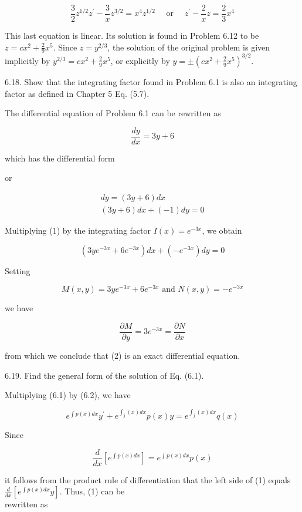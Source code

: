 \documentclass[10pt]{article}
\begin{document}
$$
\frac{3}{2} z^{1 / 2} z^{\prime}-\frac{3}{x} z^{3 / 2}=x^{4} z^{1 / 2} \quad \text { or } \quad z^{\prime}-\frac{2}{x} z=\frac{2}{3} x^{4}
$$

This last equation is linear. Its solution is found in Problem 6.12 to be $z=c x^{2}+\frac{2}{9} x^{5}$. Since $z=y^{2 / 3}$, the solution of the original problem is given implicitly by $y^{2 / 3}=c x^{2}+\frac{2}{9} x^{5}$, or explicitly by $y= \pm\left(c x^{2}+\frac{2}{9} x^{5}\right)^{3 / 2}$.

6.18. Show that the integrating factor found in Problem 6.1 is also an integrating factor as defined in Chapter 5 Eq. (5.7).

The differential equation of Problem 6.1 can be rewritten as

$$
\frac{d y}{d x}=3 y+6
$$

which has the differential form

or


\begin{gather*}
d y=(3 y+6) d x \\
(3 y+6) d x+(-1) d y=0 \tag{1}
\end{gather*}


Multiplying (1) by the integrating factor $I(x)=e^{-3 x}$, we obtain


\begin{equation*}
\left(3 y e^{-3 x}+6 e^{-3 x}\right) d x+\left(-e^{-3 x}\right) d y=0 \tag{2}
\end{equation*}


Setting

$$
M(x, y)=3 y e^{-3 x}+6 e^{-3 x} \text { and } N(x, y)=-e^{-3 x}
$$

we have

$$
\frac{\partial M}{\partial y}=3 e^{-3 x}=\frac{\partial N}{\partial x}
$$

from which we conclude that (2) is an exact differential equation.

6.19. Find the general form of the solution of Eq. (6.1).

Multiplying (6.1) by (6.2), we have


\begin{equation*}
e^{\int p(x) d x} y^{\prime}+e^{\int_{j}(x) d x} p(x) y=e^{\int_{j}(x) d x} q(x) \tag{1}
\end{equation*}


Since

$$
\frac{d}{d x}\left[e^{\int p(x) d x}\right]=e^{\int p(x) d x} p(x)
$$

it follows from the product rule of differentiation that the left side of (1) equals $\frac{d}{d x}\left[e^{\int p(x) d x} y\right]$. Thus, (1) can be\\
rewritten as
\end{document}
